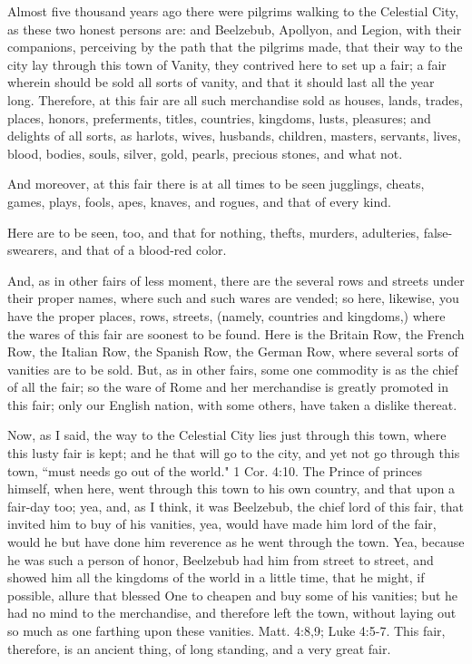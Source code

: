 Almost five thousand years ago there were pilgrims walking to the Celestial City, as these two honest persons are: and Beelzebub, Apollyon, and Legion, with their companions, perceiving by the path that the pilgrims made, that their way to the city lay through this town of Vanity, they contrived here to set up a fair; a fair wherein should be sold all sorts of vanity, and that it should last all the year long. Therefore, at this fair are all such merchandise sold as houses, lands, trades, places, honors, preferments, titles, countries, kingdoms, lusts, pleasures; and delights of all sorts, as harlots, wives, husbands, children, masters, servants, lives, blood, bodies, souls, silver, gold, pearls, precious stones, and what not.

And moreover, at this fair there is at all times to be seen jugglings, cheats, games, plays, fools, apes, knaves, and rogues, and that of every kind.

Here are to be seen, too, and that for nothing, thefts, murders, adulteries, false-swearers, and that of a blood-red color.

And, as in other fairs of less moment, there are the several rows and streets under their proper names, where such and such wares are vended; so here, likewise, you have the proper places, rows, streets, (namely, countries and kingdoms,) where the wares of this fair are soonest to be found. Here is the Britain Row, the French Row, the Italian Row, the Spanish Row, the German Row, where several sorts of vanities are to be sold. But, as in other fairs, some one commodity is as the chief of all the fair; so the ware of Rome and her merchandise is greatly promoted in this fair; only our English nation, with some others, have taken a dislike thereat.

Now, as I said, the way to the Celestial City lies just through this town, where this lusty fair is kept; and he that will go to the city, and yet not go through this town, ``must needs go out of the world." 1 Cor. 4:10. The Prince of princes himself, when here, went through this town to his own country, and that upon a fair-day too; yea, and, as I think, it was Beelzebub, the chief lord of this fair, that invited him to buy of his vanities, yea, would have made him lord of the fair, would he but have done him reverence as he went through the town. Yea, because he was such a person of honor, Beelzebub had him from street to street, and showed him all the kingdoms of the world in a little time, that he might, if possible, allure that blessed One to cheapen and buy some of his vanities; but he had no mind to the merchandise, and therefore left the town, without laying out so much as one farthing upon these vanities. Matt. 4:8,9; Luke 4:5-7. This fair, therefore, is an ancient thing, of long standing, and a very great fair.

